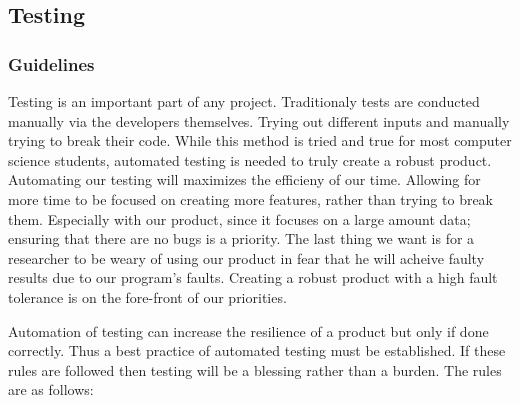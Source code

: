 \subsection{Testing}
\subsubsection{Guidelines}
  Testing is an important part of any project. Traditionaly tests are conducted manually via the developers themselves. Trying out different inputs and manually trying to break their code. While this method is tried and true for most computer science students, automated testing is needed to truly create a robust product. Automating our testing will maximizes the efficieny of our time. Allowing for more time to be focused on creating more features, rather than trying to break them. Especially with our product, since it focuses on a large amount data; ensuring that there are no bugs is a priority. The last thing we want is for a researcher to be weary of using our product in fear that he will acheive faulty results due to our program's faults. Creating a robust product with a high fault tolerance is on the fore-front of our priorities.
\par Automation of testing can increase the resilience of a product but only if done correctly. Thus a best practice of automated testing must be established. If these rules are followed then testing will be a blessing rather than a burden. The rules are as follows:\newline

